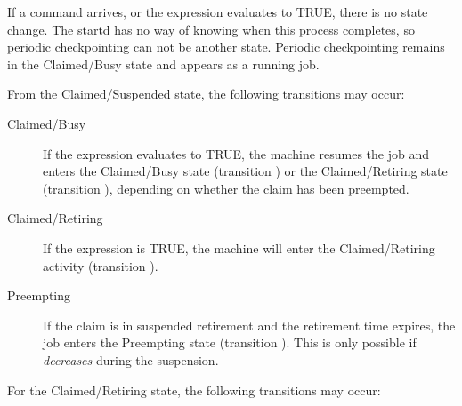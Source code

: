 If a  command arrives,
or the  expression evaluates to TRUE,
there is no state change.
The startd has no way of knowing when this process completes,
so periodic checkpointing can not be another state.
Periodic checkpointing remains in the Claimed/Busy state
and appears as a running job.

From the Claimed/Suspended state, the following transitions
may occur:

\begin{description}
  
\item[Claimed/Busy] If the  expression evaluates to
  TRUE, the machine resumes the job and enters the
  Claimed/Busy state (transition ) or the Claimed/Retiring
  state (transition ), depending on whether the claim
  has been preempted.

\item[Claimed/Retiring] If the  expression is TRUE, the machine
  will enter the Claimed/Retiring activity (transition ).

\item[Preempting] If the claim is in suspended retirement and the
  retirement time expires, the job enters the Preempting state
  (transition ).  This is only possible if
   \emph{decreases} during the suspension.


\end{description}

For the Claimed/Retiring state, the following transitions may occur:


